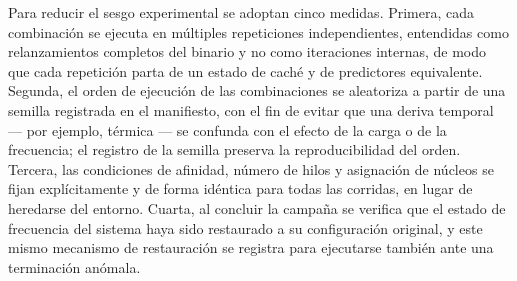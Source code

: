 \documentclass[12pt,oneside,spanish]{book}
\begin{document}
Para reducir el sesgo experimental se adoptan cinco medidas. Primera, cada combinación se ejecuta en múltiples repeticiones independientes, entendidas como relanzamientos completos del binario y no como iteraciones internas, de modo que cada repetición parta de un estado de caché y de predictores equivalente. Segunda, el orden de ejecución de las combinaciones se aleatoriza a partir de una semilla registrada en el manifiesto, con el fin de evitar que una deriva temporal --- por ejemplo, térmica --- se confunda con el efecto de la carga o de la frecuencia; el registro de la semilla preserva la reproducibilidad del orden. Tercera, las condiciones de afinidad, número de hilos y asignación de núcleos se fijan explícitamente y de forma idéntica para todas las corridas, en lugar de heredarse del entorno. Cuarta, al concluir la campaña se verifica que el estado de frecuencia del sistema haya sido restaurado a su configuración original, y este mismo mecanismo de restauración se registra para ejecutarse también ante una terminación anómala.
\end{document}
